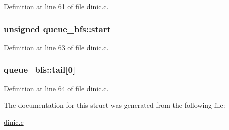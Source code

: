 Definition at line 61 of file dinic.c.

\hypertarget{structqueue__bfs_a39ce7143813704c9c3a4b62c85f51cc9}{
\subsubsection[{start}]{\setlength{\rightskip}{0pt plus 5cm}unsigned {\bf queue\_\-bfs::start}}}
\label{structqueue__bfs_a39ce7143813704c9c3a4b62c85f51cc9}


Definition at line 63 of file dinic.c.

\hypertarget{structqueue__bfs_a0c790ded4b0bdb16f4e547e1be66776c}{
\subsubsection[{tail}]{ {\bf queue\_\-bfs::tail}\mbox{[}0\mbox{]}}}
\label{structqueue__bfs_a0c790ded4b0bdb16f4e547e1be66776c}


Definition at line 64 of file dinic.c.



The documentation for this struct was generated from the following file:\begin{DoxyCompactItemize}
\item 
\hyperlink{dinic_8c}{dinic.c}\end{DoxyCompactItemize}
